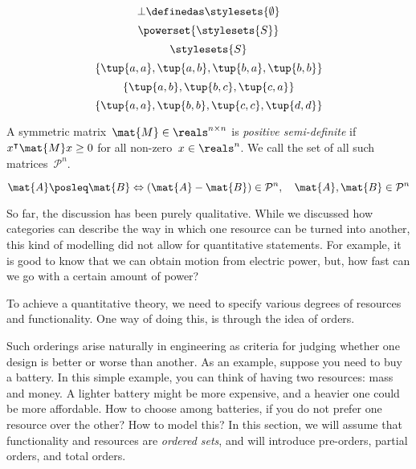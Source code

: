 {\begin{forslides}
\begin{equation*}
\end{equation*}
                \begin{equation*}
        \label{eq:pow_5}
        \bot \definedas \stylesets{\emptyset}
\end{equation*}
\begin{equation*}
        \label{eq:pow_6}
        \powerset{\stylesets{S}}
\end{equation*}
    \begin{equation*}
        \label{eq:pow_7}
        \stylesets{S}
\end{equation*}
    \begin{equation*}
        \label{eq:pre_ex1}
        \{\tup{a,a},\tup{a,b},\tup{b,a},\tup{b,b}\}
\end{equation*}
        \begin{equation*}
        \label{eq:pre_ex2}
        \{\tup{a,b},\tup{b,c},\tup{c,a}\}
\end{equation*}
            \begin{equation*}
        \label{eq:pre_ex3}
        \{\tup{a,a},\tup{b,b},\tup{c,c},\tup{d,d}\}
\end{equation*}
    \begin{definition}
        \label{def:posdef}
        A symmetric matrix~$\mat{M}\in \reals^{n\times n}$ is \emph{positive semi-definite} if~$x^\intercal \mat{M}x\geq 0$ for all non-zero~$x\in \reals^n$. We call the set of all such matrices~$\mathcal{P}^n$.
\end{definition}
    \begin{equation*}
        \label{eq:posdef_1}
        \mat{A}\posleq \mat{B} \Leftrightarrow (\mat{A}-\mat{B})\in \mathcal{P}^n, \quad \mat{A},\mat{B}\in \mathcal{P}^n
\end{equation*}
\end{forslides}
}


So far, the discussion has been purely qualitative. While we discussed how
categories can describe the way in which one resource can be turned into another,
this kind of modelling did not allow for quantitative statements. For example, it
is good to know that we can obtain motion from electric power, but, how fast can
we go with a certain amount of power?

To achieve a quantitative theory, we need to specify various degrees of resources and functionality.
One way of doing this, is through the idea of orders.


Such orderings arise naturally in engineering as criteria for judging whether one design is better or worse than another.
As an example, suppose you need to buy a battery.
In this simple example, you can think of having two resources: mass and money.
A lighter battery might be more expensive, and a heavier one could be more affordable.
How to choose among batteries, if you do not prefer one resource over the other? How to model this? In this section, we will assume that functionality and resources
are \emph{ordered sets}, and will introduce pre-orders, partial orders, and total orders.


